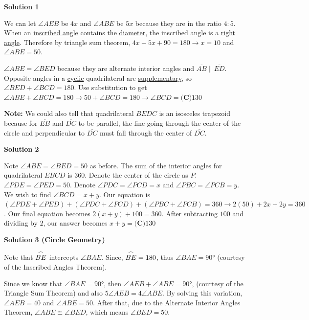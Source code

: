 \begin{enumerate}
\textbf{Solution 1}

We can let $\angle AEB$ be $4x$ and $\angle ABE$ be $5x$ because they are in the ratio $4 : 5$. When an \href{https://artofproblemsolving.com/wiki/index.php?title=Inscribed\_angle}{inscribed angle} contains the \href{https://artofproblemsolving.com/wiki/index.php?title=Diameter}{diameter}, the inscribed angle is a \href{https://artofproblemsolving.com/wiki/index.php?title=Right\_angle}{right angle}. Therefore by triangle sum theorem, $4x+5x+90=180 \longrightarrow x=10$ and $\angle ABE = 50$.

 $\angle ABE = \angle BED$ because they are alternate interior angles and $\overline{AB} \parallel \overline{ED}$. Opposite angles in a \href{https://artofproblemsolving.com/wiki/index.php?title=Cyclic}{cyclic} quadrilateral are \href{https://artofproblemsolving.com/wiki/index.php?title=Supplementary}{supplementary}, so $\angle BED + \angle BCD = 180$. Use substitution to get $\angle ABE + \angle BCD = 180 \longrightarrow 50 + \angle BCD = 180 \longrightarrow \angle BCD = \boxed{\textbf{(C)} 130}$

 \textbf{Note:} We could also tell that quadrilateral $BEDC$ is an isosceles trapezoid because for $\overline{EB}$ and $\overline{DC}$ to be parallel, the line going through the center of the circle and perpendicular to $\overline{DC}$ must fall through the center of $\overline{DC}$.

 



\textbf{Solution 2}

Note $\angle ABE = \angle BED=50$ as before. The sum of the interior angles for quadrilateral $EBCD$ is $360$. Denote the center of the circle as $P$. $\angle PDE = \angle PED = 50$. Denote $\angle PDC = \angle PCD = x$ and $\angle PBC = \angle PCB = y$. We wish to find $\angle BCD = x+y$. Our equation is $(\angle PDE +\angle PED)+(\angle PDC+\angle PCD)+(\angle PBC + \angle PCB) = 360 \longrightarrow 2(50) + 2x +2y = 360$. Our final equation becomes $2(x+y)+100 = 360$. After subtracting $100$ and dividing by $2$, our answer becomes $x+y=\boxed{\textbf{(C)} 130}$




\textbf{Solution 3 (Circle Geometry)}

Note that $\overset{\Large\frown} {BE}$ intercepts $\angle BAE$. Since, $\overset{\Large\frown} {BE}=180$, thus $\angle BAE=90°$ (courtesy of the Inscribed Angles Theorem). 

 Since we know that $\angle BAE=90°$, then $\angle AEB + \angle ABE = 90°$, (courtesy of the Triangle Sum Theorem) and also $5\angle AEB = 4\angle ABE$. By solving this variation, $\angle AEB = 40$ and $\angle ABE = 50$. After that, due to the Alternate Interior Angles Theorem, $\angle ABE \cong \angle BED$, which means $\angle BED = 50$. 


\end{enumerate}
